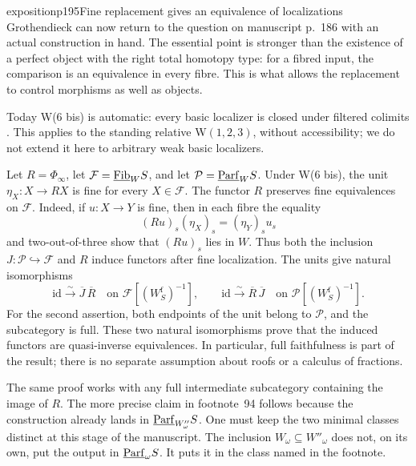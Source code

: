 \begin{dcomment}{exposition}{p195}{Fine replacement gives an equivalence of localizations}
Grothendieck can now return to the question on manuscript p.~186 with an actual construction in hand. The essential point is stronger than the existence of a perfect object with the right total homotopy type: for a fibred input, the comparison is an equivalence in every fibre. This is what allows the replacement to control morphisms as well as objects.

Today W(6 bis) is automatic: every basic localizer is closed under filtered colimits \citep[Corollary~4.2.22]{Cisinski2006}. This applies to the standing relative W$(1,2,3)$, without accessibility; we do not extend it here to arbitrary weak basic localizers.

Let $R=\Phi_\infty$, let $\mathcal F=\underline{\mathrm{Fib}}_W S$, and let $\mathcal P=\underline{\mathrm{Parf}}_W S$. Under W(6 bis), the unit $\eta_X:X\to RX$ is fine for every $X\in\mathcal F$. The functor $R$ preserves fine equivalences on $\mathcal F$. Indeed, if $u:X\to Y$ is fine, then in each fibre the equality
\[
 (Ru)_s(\eta_X)_s=(\eta_Y)_s u_s
\]
and two-out-of-three show that $(Ru)_s$ lies in $W$. Thus both the inclusion $J:\mathcal P\hookrightarrow\mathcal F$ and $R$ induce functors after fine localization. The units give natural isomorphisms
\[
 \mathrm{id}\xrightarrow{\sim}\overline J\,\overline R
 \quad\text{on }\mathcal F[(W_S^{\mathrm f})^{-1}],
 \qquad
 \mathrm{id}\xrightarrow{\sim}\overline R\,\overline J
 \quad\text{on }\mathcal P[(W_S^{\mathrm f})^{-1}].
\]
For the second assertion, both endpoints of the unit belong to $\mathcal P$, and the subcategory is full. These two natural isomorphisms prove that the induced functors are quasi-inverse equivalences. In particular, full faithfulness is part of the result; there is no separate assumption about roofs or a calculus of fractions.

The same proof works with any full intermediate subcategory containing the image of $R$. The more precise claim in footnote~94 follows because the construction already lands in $\underline{\mathrm{Parf}}_{W''_\omega}S$. One must keep the two minimal classes distinct at this stage of the manuscript. The inclusion $W_\omega\subseteq W''_\omega$ does not, on its own, put the output in $\underline{\mathrm{Parf}}_\omega S$. It puts it in the class named in the footnote.


\end{dcomment}

